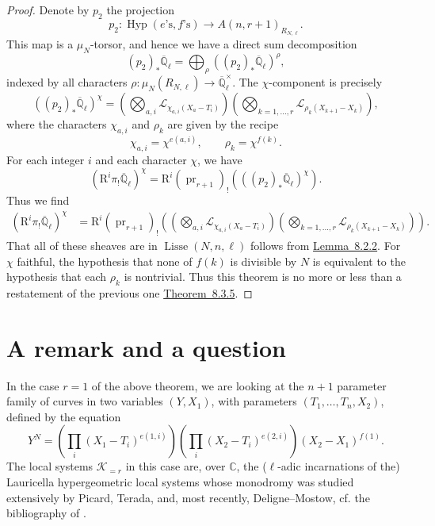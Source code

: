 \begin{proof}
Denote by \(p_2\) the projection
\[
p_2:\operatorname{Hyp}(e\text{'s},f\text{'s})\to A(n,r+1)_{R_{N,\ell}}.
\]
This map is a \(\mu_N\)-torsor, and hence we have a direct sum decomposition
\[
(p_2)_*\overline{\mathbb{Q}}_\ell=\bigoplus_\rho((p_2)_*\overline{\mathbb{Q}}_\ell)^\rho,
\]
indexed by all characters \(\rho:\mu_N(R_{N,\ell})\to\overline{\mathbb{Q}}_\ell^{\times}\). The \(\chi\)-component is precisely
\[
((p_2)_*\overline{\mathbb{Q}}_\ell)^\chi=\left(\bigotimes_{a,i}\mathcal{L}_{\chi_{a,i}(X_a-T_i)}\right)\left(\bigotimes_{k=1,\ldots,r}\mathcal{L}_{\rho_k(X_{k+1}-X_k)}\right),
\]
where the characters \(\chi_{a,i}\) and \(\rho_k\) are given by the recipe
\[
\chi_{a,i}=\chi^{e(a,i)},\qquad \rho_k=\chi^{f(k)}.
\]
For each integer \(i\) and each character \(\chi\), we have
\[
(\mathrm{R}^i\pi_!\overline{\mathbb{Q}}_\ell)^\chi=\mathrm{R}^i(\operatorname{pr}_{r+1})_!(((p_2)_*\overline{\mathbb{Q}}_\ell)^\chi).
\]
Thus we find
\[
\begin{aligned}
(\mathrm{R}^i\pi_!\overline{\mathbb{Q}}_\ell)^\chi
&=\mathrm{R}^i(\operatorname{pr}_{r+1})_!\left(\left(\bigotimes_{a,i}\mathcal{L}_{\chi_{a,i}(X_a-T_i)}\right)\left(\bigotimes_{k=1,\ldots,r}\mathcal{L}_{\rho_k(X_{k+1}-X_k)}\right)\right).
\end{aligned}
\]
That all of these sheaves are in \(\operatorname{Lisse}(N,n,\ell)\) follows from \hyperref[lem:8.2.2]{Lemma~8.2.2}. For \(\chi\) faithful, the hypothesis that none of \(f(k)\) is divisible by \(N\) is equivalent to the hypothesis that each \(\rho_k\) is nontrivial. Thus this theorem is no more or less than a restatement of the previous one \hyperref[thm:8.3.5]{Theorem~8.3.5}.
\end{proof}

\section{A remark and a question}
\label{sec:8.5}

In the case \(r=1\) of the above theorem, we are looking at the \(n+1\) parameter family of curves in two variables \((Y,X_1)\), with parameters \((T_1,\ldots,T_n,X_2)\), defined by the equation
\[
Y^N=\left(\prod_i(X_1-T_i)^{e(1,i)}\right)\left(\prod_i(X_2-T_i)^{e(2,i)}\right)(X_2-X_1)^{f(1)}.
\]
The local systems \(\mathcal{K}_{=r}\) in this case are, over \(\mathbb{C}\), the (\(\ell\)-adic incarnations of the) Lauricella hypergeometric local systems whose monodromy was studied extensively by Picard, Terada, and, most recently, Deligne--Mostow, cf. the bibliography of \cite{De-Mos}.

